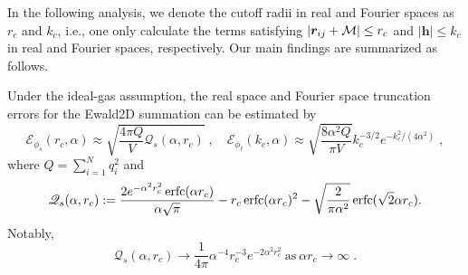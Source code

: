 In the following analysis, we denote the cutoff radii in real and Fourier spaces as $r_c$ and $k_c$, i.e., one only calculate the terms satisfying $\lvert\bm{r}_{ij} + \mathcal{M}\rvert \leq r_c$ and 
$|\bm{h }|\leq k_c$ in real and Fourier spaces, respectively.
Our main findings are summarized as follows. 

\begin{thm}\label{thm:ewald2d_phi_error}
	Under the ideal-gas assumption, the real space and Fourier space truncation errors for the Ewald2D summation can be estimated by
	\begin{equation}\label{eq::Ephi}
		\mathscr{E}_{\phi_s} (r_c, \alpha) \approx \sqrt{\frac{4\pi Q}{V}\mathscr{Q}_{s}(\alpha,r_c)}\;, \quad
		\mathscr{E}_{\phi_\ell} (k_c, \alpha) \approx \sqrt{\frac{8\alpha^2Q}{\pi V}}k_c^{-3/2}e^{-k_c^2/(4\alpha^2)}\;,
	\end{equation}
	where $Q = \sum_{i=1}^{N} q_{i}^2$ and
	\begin{equation}\label{eq::Qs2}
		\mathscr{Q}_{s}(\alpha,r_c):=\frac{2e^{-\alpha^2r_c^2}\operatorname{erfc}(\alpha r_c)}{\alpha\sqrt{\pi}}-r_c\operatorname{erfc}(\alpha r_c)^2-\sqrt{\frac{2}{\pi\alpha^2}}\operatorname{erfc}(\sqrt{2}\alpha r_c).
	\end{equation}
	Notably,
	\begin{equation}\label{eq::Qs}
		\mathscr{Q}_{s}(\alpha,r_c)\rightarrow\frac{1}{4\pi}\alpha^{-4} r_c^{-3}e^{-2\alpha^2r_c^2}~\text{as}~\alpha r_c\rightarrow \infty\;. 
	\end{equation}
\end{thm}


